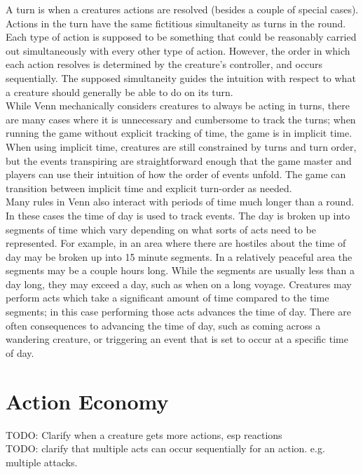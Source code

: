 \documentclass[letterpaper,titlepage,openany,twocolumn]{book}
\begin{document}
A turn is when a creatures actions are resolved (besides a couple of special cases). Actions in the turn have the same fictitious simultaneity as turns in the round. Each type of action is supposed to be something that could be reasonably carried out simultaneously with every other type of action. However, the order in which each action resolves is determined by the creature’s controller, and occurs sequentially. The supposed simultaneity guides the intuition with respect to what a creature should generally be able to do on its turn.\\

While Venn mechanically considers creatures to always be acting in turns, there are many cases where it is unnecessary and cumbersome to track the turns; when running the game without explicit tracking of time, the game is in implicit time. When using implicit time, creatures are still constrained by turns and turn order, but the events transpiring are straightforward enough that the game master and players can use their intuition of how the order of events unfold. The game can transition between implicit time and explicit turn-order as needed.\\

Many rules in Venn also interact with periods of time much longer than a round. In these cases the time of day is used to track events. The day is broken up into segments of time which vary depending on what sorts of acts need to be represented. For example, in an area where there are hostiles about the time of day may be broken up into 15 minute segments. In a relatively peaceful area the segments may be a couple hours long. While the segments are usually less than a day long, they may exceed a day, such as when on a long voyage. Creatures may perform acts which take a significant amount of time compared to the time segments; in this case performing those acts advances the time of day. There are often consequences to advancing the time of day, such as coming across a wandering creature, or triggering an event that is set to occur at a specific time of day.\\

\section{Action Economy}
TODO: Clarify when a creature gets more actions, esp reactions\\
TODO: clarify that multiple acts can occur sequentially for an action. e.g. multiple attacks.\\
\end{document}
